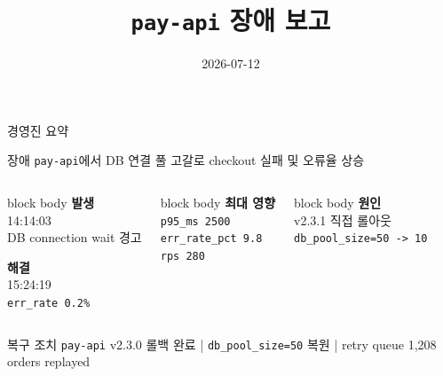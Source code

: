 \documentclass[aspectratio=169]{beamer}
\title{\texttt{pay-api} 장애 보고}
\subtitle{2026-07-12}
\author{}
\date{}
\begin{document}
\begin{frame}
  \titlepage
\end{frame}

\begin{frame}{경영진 요약}
  \begin{block}{장애}
    \texttt{pay-api}에서 DB 연결 풀 고갈로 checkout 실패 및 오류율 상승
  \end{block}

  \vspace{0.25cm}

  \begin{columns}[T]
    \begin{beamercolorbox}[wd=\linewidth,sep=0.35cm]{block body}
      \textbf{발생}\\[0.15cm]
      14:14:03\\
      DB connection wait 경고
      \vspace{0.25cm}

      \textbf{해결}\\[0.15cm]
      15:24:19\\
      \texttt{err\_rate 0.2\%}
    \end{beamercolorbox}

    \begin{beamercolorbox}[wd=\linewidth,sep=0.35cm]{block body}
      \textbf{최대 영향}\\[0.15cm]
      \texttt{p95\_ms 2500}\\
      \texttt{err\_rate\_pct 9.8}\\
      \texttt{rps 280}
    \end{beamercolorbox}

    \begin{beamercolorbox}[wd=\linewidth,sep=0.35cm]{block body}
      \textbf{원인}\\[0.15cm]
      v2.3.1 직접 롤아웃\\
      \texttt{db\_pool\_size=50 -> 10}
    \end{beamercolorbox}
  \end{columns}

  \vspace{0.35cm}

  \begin{block}{복구 조치}
    \texttt{pay-api} v2.3.0 롤백 완료
    \quad|\quad
    \texttt{db\_pool\_size=50} 복원
    \quad|\quad
    retry queue 1,208 orders replayed
  \end{block}
\end{frame}
\end{document}
